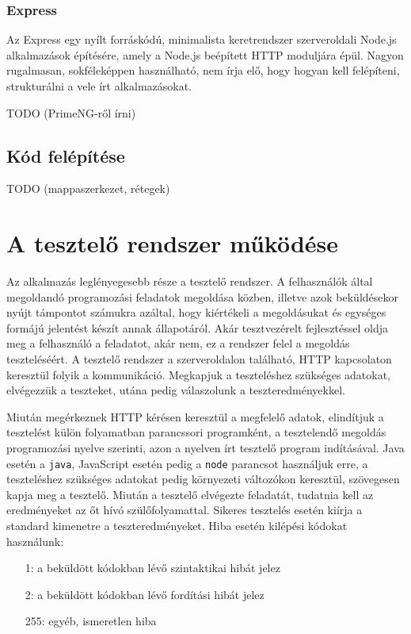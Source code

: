 \documentclass{elteikthesis}
\begin{document}
				\subsubsection{Express}
					Az Express \cite{express} egy nyílt forráskódú, minimalista keretrendszer szerveroldali Node.js alkalmazások építésére, amely a Node.js beépített HTTP moduljára épül. Nagyon rugalmasan, sokféleképpen használható, nem írja elő, hogy hogyan kell felépíteni, strukturálni a vele írt alkalmazásokat.

			TODO (PrimeNG-ről írni)
			
			\subsection{Kód felépítése}
			TODO (mappaszerkezet, rétegek)

		\section{A tesztelő rendszer működése}
			Az alkalmazás leglényegesebb része a tesztelő rendszer. A felhasználók által megoldandó programozási feladatok megoldása közben, illetve azok beküldésekor nyújt támpontot számukra azáltal, hogy kiértékeli a megoldásukat és egységes formájú jelentést készít annak állapotáról. Akár tesztvezérelt fejlesztéssel oldja meg a felhasználó a feladatot, akár nem, ez a rendszer felel a megoldás teszteléséért. A tesztelő rendszer a szerveroldalon található, HTTP kapcsolaton keresztül folyik a kommunikáció. Megkapjuk a teszteléshez szükséges adatokat, elvégezzük a teszteket, utána pedig válaszolunk a teszteredményekkel.
			
			Miután megérkeznek HTTP kérésen keresztül a megfelelő adatok, elindítjuk a tesztelést külön folyamatban parancssori programként, a tesztelendő megoldás programozási nyelve szerinti, azon a nyelven írt tesztelő program indításával. Java esetén a \texttt{java}, JavaScript esetén pedig a \texttt{node} parancsot használjuk erre, a teszteléshez szükséges adatokat pedig környezeti változókon keresztül, szövegesen kapja meg a tesztelő. Miután a tesztelő elvégezte feladatát, tudatnia kell az eredményeket az őt hívó szülőfolyamattal. Sikeres tesztelés esetén kiírja a standard kimenetre a teszteredményeket. Hiba esetén kilépési kódokat használunk:
			\begin{itemize}
				\setlength\itemsep{-0.5em}
				\item[1:] a beküldött kódokban lévő szintaktikai hibát jelez
				\item[2:] a beküldött kódokban lévő fordítási hibát jelez
				\item[255:] egyéb, ismeretlen hiba
			\end{itemize}
\end{document}
